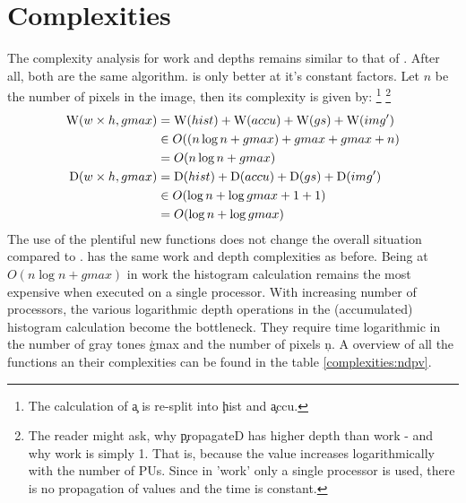 \section{Complexities}
  The complexity analysis for work and depths remains similar to that of \ndpn.
  After all, both are the same algorithm. \ndpv is only better at it's constant factors.
  Let $n$ be the number of pixels in the image,
  then its complexity is given by:
  \footnote{
  The calculation of \c{a} is re-split into \c{hist} and \c{accu}.
  }
  \footnote{
  The reader might ask, why \c{propagateD} has higher depth than work 
  - and why work is simply 1. That is, because the value
  increases logarithmically with the number of PUs.
  Since in 'work' only a single processor is used,
  there is no propagation of values and the time is constant.
  }
  \begin{equation*}
  \begin{split}
  \W(w \times h,gmax)
        & = \W(hist) + \W(accu) + \W(gs) + \comment{\W(expandPS) +} \W(img') \\
        & \in O( (n \log n + gmax) + gmax + gmax \comment{ + 1} + n) \\
        & = O(n \log n + gmax) \\
  \D(w \times h,gmax)
      & = \D(hist) + \D(accu) + \D(gs) \comment{+ \D(expandPS)} + \D(img') \\
      & \in O(\log n + \log gmax + 1 + 1)  \\
      & = O(\log n + \log gmax) \\
  \end{split}
  \end{equation*}
  The use of the plentiful new functions does not change the overall situation compared to \ndpn.
  \ndpv has the same work and depth complexities as before.
  Being at $O(n \log n + gmax)$ in work
  the histogram calculation remains the most expensive when executed on a single processor.
  With increasing number of processors, the various logarithmic depth
  operations in the (accumulated) histogram calculation become the bottleneck.
  They require time logarithmic in the number of gray tones
  \c{gmax} and the number of pixels \c{n}.
  A overview of all the functions an their complexities can be found in the table \ref{complexities:ndpv}.
  

